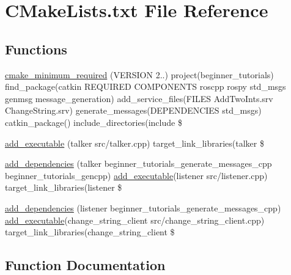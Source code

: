 \hypertarget{CMakeLists_8txt}{}\section{C\+Make\+Lists.\+txt File Reference}
\label{CMakeLists_8txt}
\subsection*{Functions}
\begin{DoxyCompactItemize}
\item 
\hyperlink{CMakeLists_8txt_a257873ea53487c7f7f72678d9fcbbd0d}{cmake\+\_\+minimum\+\_\+required} (V\+E\+R\+S\+I\+ON 2..) project(beginner\+\_\+tutorials) find\+\_\+package(catkin R\+E\+Q\+U\+I\+R\+ED C\+O\+M\+P\+O\+N\+E\+N\+TS roscpp rospy std\+\_\+msgs genmsg message\+\_\+generation) add\+\_\+service\+\_\+files(F\+I\+L\+ES Add\+Two\+Ints.\+srv Change\+String.\+srv) generate\+\_\+messages(D\+E\+P\+E\+N\+D\+E\+N\+C\+I\+ES std\+\_\+msgs) catkin\+\_\+package() include\+\_\+directories(include \$
\item 
\hyperlink{CMakeLists_8txt_a40715d33c1a048014457a014e14ff703}{add\+\_\+executable} (talker src/talker.\+cpp) target\+\_\+link\+\_\+libraries(talker \$
\item 
\hyperlink{CMakeLists_8txt_a1f028819c1eefa47f1f413c6954f0ddb}{add\+\_\+dependencies} (talker beginner\+\_\+tutorials\+\_\+generate\+\_\+messages\+\_\+cpp beginner\+\_\+tutorials\+\_\+gencpp) \hyperlink{CMakeLists_8txt_a40715d33c1a048014457a014e14ff703}{add\+\_\+executable}(listener src/listener.\+cpp) target\+\_\+link\+\_\+libraries(listener \$
\item 
\hyperlink{CMakeLists_8txt_aff6b4efc61b9086ee7e78ad0c8eb5b05}{add\+\_\+dependencies} (listener beginner\+\_\+tutorials\+\_\+generate\+\_\+messages\+\_\+cpp) \hyperlink{CMakeLists_8txt_a40715d33c1a048014457a014e14ff703}{add\+\_\+executable}(change\+\_\+string\+\_\+client src/change\+\_\+string\+\_\+client.\+cpp) target\+\_\+link\+\_\+libraries(change\+\_\+string\+\_\+client \$
\end{DoxyCompactItemize}


\subsection{Function Documentation}
